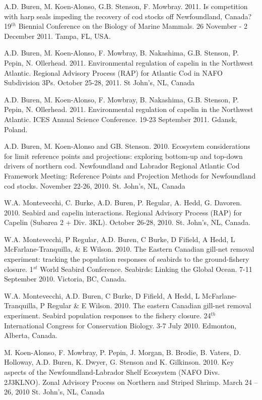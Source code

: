 \documentclass{res}
\begin{document}
\begin{resume}
\begin{hangparas}{.4in}{1}
A.D. Buren, M. Koen-Alonso, G.B. Stenson, F. Mowbray. 2011. Is competition with harp seals impeding the recovery of cod stocks off Newfoundland, Canada? 19$^{th}$ Biennial Conference on the Biology of Marine Mammals. 26 November - 2 December 2011. Tampa, FL, USA.

A.D. Buren, M. Koen-Alonso, F. Mowbray, B. Nakashima, G.B. Stenson, P. Pepin, N. Ollerhead. 2011. Environmental regulation of capelin in the Northwest Atlantic. Regional Advisory Process (RAP) for Atlantic Cod in NAFO Subdivision 3Ps. October 25-28, 2011. St John's, NL, Canada

A.D. Buren, M. Koen-Alonso, F. Mowbray, B. Nakashima, G.B. Stenson, P. Pepin, N. Ollerhead. 2011. Environmental regulation of capelin in the Northwest Atlantic. ICES Annual Science Conference. 19-23 September 2011. Gdansk, Poland.

A.D. Buren, M. Koen-Alonso and GB. Stenson. 2010. Ecosystem considerations for limit reference points and projections: exploring bottom-up and top-down drivers of northern cod. Newfoundland and Labrador Regional Atlantic Cod Framework Meeting: Reference Points and Projection Methods for Newfoundland cod stocks. November 22-26, 2010. St. John’s, NL, Canada

W.A. Montevecchi, C. Burke, A.D. Buren, P. Regular, A. Hedd, G. Davoren. 2010. Seabird and capelin interactions. Regional Advisory Process (RAP) for Capelin (Subarea 2 + Div. 3KL). October 26-28, 2010. St. John’s, NL, Canada. 

W.A. Montevecchi, P Regular, A.D. Buren, C Burke, D Fifield, A Hedd, L McFarlane-Tranquilla, \& E Wilson. 2010. The Eastern Canadian gill-net removal experiment: tracking the population responses of seabirds to the ground-fishery closure. 1$^{st}$ World Seabird Conference. Seabirds: Linking the Global Ocean. 7-11 September 2010. Victoria, BC, Canada.

W.A. Montevecchi, A.D. Buren, C Burke, D Fifield, A Hedd, L McFarlane-Tranquilla, P Regular \& E Wilson. 2010. The eastern Canadian gill-net removal experiment. Seabird population responses to the fishery closure. 24$^{th}$ International Congress for Conservation Biology. 3-7 July 2010. Edmonton, Alberta, Canada.

M. Koen-Alonso, F. Mowbray, P. Pepin, J. Morgan, B. Brodie, B. Vaters, D. Holloway, A.D. Buren, K. Dwyer, G. Stenson and K. Gilkinson. 2010. Key aspects of the Newfoundland-Labrador Shelf Ecosystem (NAFO Divs. 2J3KLNO). Zonal Advisory Process on Northern and Striped Shrimp. March 24 – 26, 2010 St. John’s, NL, Canada


\end{hangparas}
\end{resume}
\end{document}
